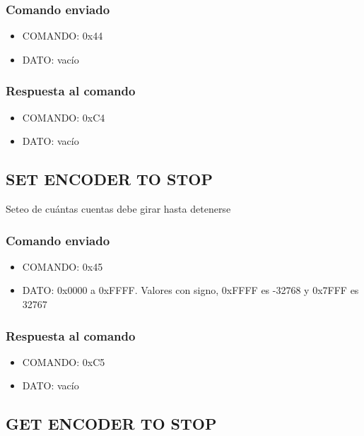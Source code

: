 \documentclass[a4paper,10pt]{article}
\begin{document}
\subsubsection*{Comando enviado}

\begin{itemize}
	\item{COMANDO:} 0x44
	\item{DATO:} vac\'io
\end{itemize}

\subsubsection*{Respuesta al comando}

\begin{itemize}
	\item{COMANDO:} 0xC4
	\item{DATO:} vac\'io
\end{itemize}

\subsection{SET ENCODER TO STOP}
\label{set_encoder_to_stop}

Seteo de cu\'antas cuentas debe girar hasta detenerse

\subsubsection*{Comando enviado}

\begin{itemize}
	\item{COMANDO:} 0x45
	\item{DATO:} 0x0000 a 0xFFFF. Valores con signo, 0xFFFF es -32768 y 0x7FFF es 32767
\end{itemize}

\subsubsection*{Respuesta al comando}

\begin{itemize}
	\item{COMANDO:} 0xC5
	\item{DATO:} vac\'io
\end{itemize}

\subsection{GET ENCODER TO STOP}
\label{get_encoder_to_stop}
\end{document}

